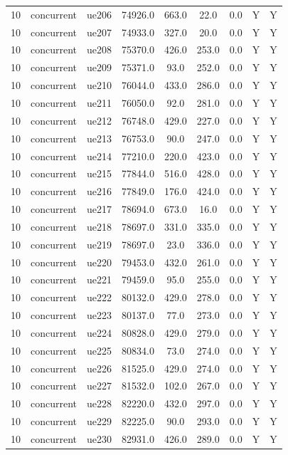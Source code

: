 \begin{table}[ht]
\begin{tabular}{|c|c|c|c|c|c|c|c|c|}
10 & concurrent & ue206 & 74926.0 & 663.0 & 22.0 & 0.0 & Y & Y \\
10 & concurrent & ue207 & 74933.0 & 327.0 & 20.0 & 0.0 & Y & Y \\
10 & concurrent & ue208 & 75370.0 & 426.0 & 253.0 & 0.0 & Y & Y \\
10 & concurrent & ue209 & 75371.0 & 93.0 & 252.0 & 0.0 & Y & Y \\
10 & concurrent & ue210 & 76044.0 & 433.0 & 286.0 & 0.0 & Y & Y \\
10 & concurrent & ue211 & 76050.0 & 92.0 & 281.0 & 0.0 & Y & Y \\
10 & concurrent & ue212 & 76748.0 & 429.0 & 227.0 & 0.0 & Y & Y \\
10 & concurrent & ue213 & 76753.0 & 90.0 & 247.0 & 0.0 & Y & Y \\
10 & concurrent & ue214 & 77210.0 & 220.0 & 423.0 & 0.0 & Y & Y \\
10 & concurrent & ue215 & 77844.0 & 516.0 & 428.0 & 0.0 & Y & Y \\
10 & concurrent & ue216 & 77849.0 & 176.0 & 424.0 & 0.0 & Y & Y \\
10 & concurrent & ue217 & 78694.0 & 673.0 & 16.0 & 0.0 & Y & Y \\
10 & concurrent & ue218 & 78697.0 & 331.0 & 335.0 & 0.0 & Y & Y \\
10 & concurrent & ue219 & 78697.0 & 23.0 & 336.0 & 0.0 & Y & Y \\
10 & concurrent & ue220 & 79453.0 & 432.0 & 261.0 & 0.0 & Y & Y \\
10 & concurrent & ue221 & 79459.0 & 95.0 & 255.0 & 0.0 & Y & Y \\
10 & concurrent & ue222 & 80132.0 & 429.0 & 278.0 & 0.0 & Y & Y \\
10 & concurrent & ue223 & 80137.0 & 77.0 & 273.0 & 0.0 & Y & Y \\
10 & concurrent & ue224 & 80828.0 & 429.0 & 279.0 & 0.0 & Y & Y \\
10 & concurrent & ue225 & 80834.0 & 73.0 & 274.0 & 0.0 & Y & Y \\
10 & concurrent & ue226 & 81525.0 & 429.0 & 274.0 & 0.0 & Y & Y \\
10 & concurrent & ue227 & 81532.0 & 102.0 & 267.0 & 0.0 & Y & Y \\
10 & concurrent & ue228 & 82220.0 & 432.0 & 297.0 & 0.0 & Y & Y \\
10 & concurrent & ue229 & 82225.0 & 90.0 & 293.0 & 0.0 & Y & Y \\
10 & concurrent & ue230 & 82931.0 & 426.0 & 289.0 & 0.0 & Y & Y \\

\end{tabular}
\end{table}
